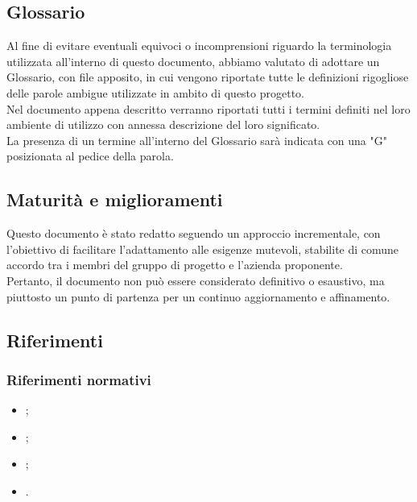 \subsection{Glossario}
Al fine di evitare eventuali equivoci o incomprensioni riguardo la terminologia utilizzata all’interno di questo documento, 
abbiamo valutato di adottare un Glossario, con file apposito, in cui
vengono riportate tutte le definizioni rigogliose delle parole ambigue utilizzate in ambito di
questo progetto.\\
Nel documento appena descritto verranno riportati tutti i termini definiti nel
loro ambiente di utilizzo con annessa descrizione del loro significato.\\
La presenza di un termine all'interno del Glossario sarà indicata con una "G" posizionata al pedice della parola.

\subsection{Maturità e miglioramenti}
Questo documento è stato redatto seguendo un approccio incrementale, con l'obiettivo di facilitare l'adattamento alle esigenze mutevoli, stabilite di comune accordo tra i membri del gruppo di progetto e l'azienda proponente.\\
Pertanto, il documento non può essere considerato definitivo o esaustivo, ma piuttosto un punto di partenza per un continuo aggiornamento e affinamento.

\subsection{Riferimenti}
\subsubsection{Riferimenti normativi}
\begin{itemize}
    \item {}; \\
    \item {}; \\
    \item {}; \\
    \item {}.
\end{itemize}

